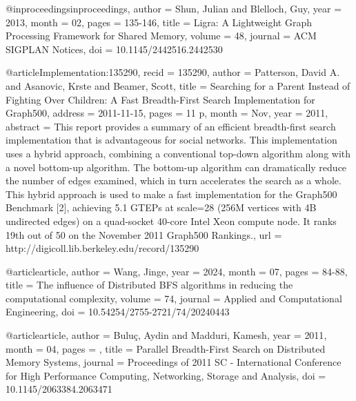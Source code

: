 @inproceedings{inproceedings,
author = {Shun, Julian and Blelloch, Guy},
year = {2013},
month = {02},
pages = {135-146},
title = {Ligra: A Lightweight Graph Processing Framework for Shared Memory},
volume = {48},
journal = {ACM SIGPLAN Notices},
doi = {10.1145/2442516.2442530}
}

@article{Implementation:135290,
      recid = {135290},
      author = {Patterson, David A. and Asanovic, Krste and Beamer, Scott},
      title = {Searching for a Parent Instead of Fighting Over Children:  A Fast Breadth-First Search Implementation for Graph500},
      address = {2011-11-15},
      pages = {11 p},
      month = {Nov},
      year = {2011},
      abstract = {This report provides a summary of an efficient  breadth-first search implementation that is advantageous  for social networks. This implementation uses a hybrid  approach, combining a conventional top-down algorithm along  with a novel bottom-up algorithm. The bottom-up algorithm  can dramatically reduce the number of edges examined, which  in turn accelerates the search as a whole. This hybrid  approach is used to make a fast implementation for the  Graph500 Benchmark [2], achieving 5.1 GTEPs at scale=28  (256M vertices with 4B undirected edges) on a quad-socket  40-core Intel Xeon compute node. It ranks 19th out of 50 on  the November 2011 Graph500 Rankings.},
      url = {http://digicoll.lib.berkeley.edu/record/135290}
}

@article{article,
author = {Wang, Jinge},
year = {2024},
month = {07},
pages = {84-88},
title = {The influence of Distributed BFS algorithms in reducing the computational complexity},
volume = {74},
journal = {Applied and Computational Engineering},
doi = {10.54254/2755-2721/74/20240443}
}

@article{article,
author = {Buluç, Aydin and Madduri, Kamesh},
year = {2011},
month = {04},
pages = {},
title = {Parallel Breadth-First Search on Distributed Memory Systems},
journal = {Proceedings of 2011 SC - International Conference for High Performance Computing, Networking, Storage and Analysis},
doi = {10.1145/2063384.2063471}
}
